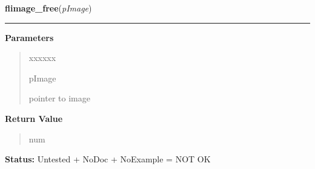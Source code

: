 \hspace{.8\funcindent}\begin{boxedminipage}{\funcwidth}

    \raggedright \textbf{flimage\_free}(\textit{pImage})

    \vspace{-1.5ex}

    \rule{\textwidth}{0.5\fboxrule}
\setlength{\parskip}{2ex}
\setlength{\parskip}{1ex}
      \textbf{Parameters}
      \vspace{-1ex}

      \begin{quote}
        \begin{Ventry}{xxxxxx}

          \item[pImage]

          pointer to image

        \end{Ventry}

      \end{quote}

      \textbf{Return Value}
    \vspace{-1ex}

      \begin{quote}
      num

      \end{quote}

\textbf{Status:} Untested + NoDoc + NoExample = NOT OK



    \end{boxedminipage}

    \label{xformslib:library:flimage_display}

    \vspace{0.5ex}

